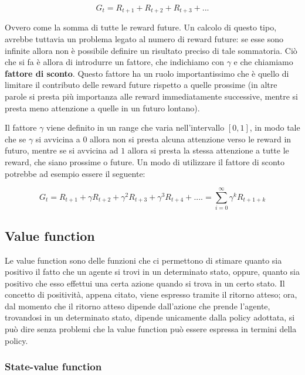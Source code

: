 \documentclass[a4paper,11pt,twoside]{report} %
\begin{document}
\begin{equation}
	G_{t} = R_{t+1} + R_{t+2} + R_{t+3} + ...
\end{equation}

Ovvero come la somma di tutte le reward future. Un calcolo di questo tipo, avrebbe tuttavia un problema legato al numero di reward future: se esse sono infinite allora non è possibile definire un risultato preciso di tale sommatoria. Ciò che si fa è allora di introdurre un fattore, che indichiamo con $\gamma$ e che chiamiamo \textbf{fattore di sconto}. Questo fattore ha un ruolo importantissimo che è quello di limitare il contributo delle reward future rispetto a quelle prossime (in altre parole si presta più importanza alle reward immediatamente successive, mentre si presta meno attenzione a quelle in un futuro lontano).

Il fattore $\gamma$ viene definito in un range che varia nell'intervallo $[0,1]$, in modo tale che se $\gamma$ si avvicina a $0$ allora non si presta alcuna attenzione verso le reward in futuro, mentre se si avvicina ad $1$ allora si presta la stessa attenzione a tutte le reward, che siano prossime o future. Un modo di utilizzare il fattore di sconto potrebbe ad esempio essere il seguente:

\begin{equation}
	G_{t} = R_{t+1} + \gamma R_{t+2} + \gamma ^{2}R_{t+3}+\gamma ^{3} R_{t+4} + .... = \sum_{i=0}^{\infty}\gamma^{k}R_{t+1+k}
\end{equation}

\subsection{Value function}

Le value function sono delle funzioni che ci permettono di stimare quanto sia positivo il fatto che un agente si trovi in un determinato stato, oppure, quanto sia positivo che esso effettui una certa azione quando si trova in un certo stato. Il concetto di positività, appena citato, viene espresso tramite il ritorno atteso; ora, dal momento che il ritorno atteso dipende dall'azione che prende l'agente, trovandosi in un determinato stato, dipende unicamente dalla policy adottata, si può dire senza problemi che la value function può essere espressa in termini della policy. 

\subsubsection{State-value function}
\end{document}
